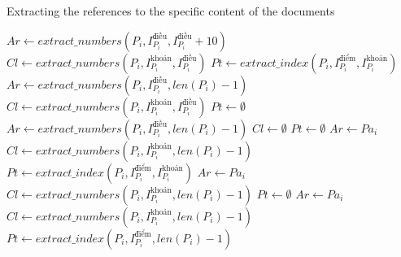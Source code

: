\begin{algorithm}
    \begin{algorithm}[H]
        \caption{Extracting the references to the specific content of the documents}
        \Fn{\FMain{}}
            {
                {
                    {
                        {
                            {
                                $Ar \gets extract\_numbers(P_i, I^{\text{điều}}_{P_i}, I^{\text{điều}}_{P_i} + 10)$\;
                                $Cl \gets extract\_numbers(P_i, I^{\text{khoản}}_{P_i}, I^{\text{điều}}_{P_i})$\;
                                $Pt \gets extract\_index(P_i, I^{\text{điểm}}_{P_i}, I^{\text{khoản}}_{P_i})$\;
                            }
                            {
                                $Ar \gets extract\_numbers(P_i, I^{\text{điều}}_{P_i}, len(P_i) - 1)$\;
                                $Cl \gets extract\_numbers(P_i, I^{\text{khoản}}_{P_i}, I^{\text{điều}}_{P_i})$\;
                                $Pt \gets \emptyset $\; 
                            }
                        }
                        {
                            $Ar \gets extract\_numbers(P_i, I^{\text{điều}}_{P_i}, len(P_i) - 1)$\;
                            $Cl \gets \emptyset $\; 
                            $Pt \gets \emptyset $\; 
                        }
                    }
                    \Else
                    {
                        {
                            {
                                $Ar \gets Pa_i$\;
                                $Cl \gets extract\_numbers(P_i, I^{\text{khoản}}_{P_i}, len(P_i) - 1)$\;
                                $Pt \gets extract\_index(P_i, I^{\text{điểm}}_{P_i}, I^{\text{khoản}}_{P_i})$\;
                            }
                            {
                                $Ar \gets Pa_i$\;
                                $Cl \gets extract\_numbers(P_i, I^{\text{khoản}}_{P_i}, len(P_i) - 1)$\;
                                $Pt \gets \emptyset $\; 
                            }
                        }
                        \Else
                        {
                            {
                                $Ar \gets Pa_i$\;
                                $Cl \gets extract\_numbers(P_i, I^{\text{khoản}}_{P_i}, len(P_i) - 1)$\;
                                $Pt \gets extract\_index(P_i, I^{\text{điểm}}_{P_i}, len(P_i) - 1)$\;
                            }
                        }
                    }
                }
            }
    \end{algorithm}


\end{algorithm}
